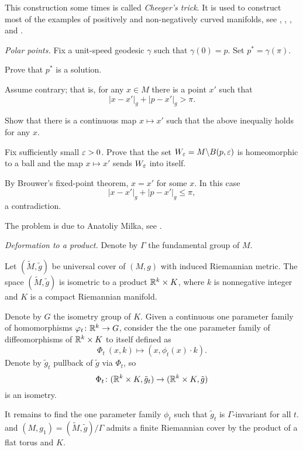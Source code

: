 This construction some times is called \emph{Cheeger's trick}.
It is used to construct most of the examples of positively and non-negatively curved manifolds,
see \cite{cheeger}, \cite{aloff-wallach}, \cite{gromoll-meyer}, \cite{eschenburg-spaces} and \cite{bazajkin}.





\textit{Polar points.}
Fix a unit-speed geodesic $\gamma$ such that $\gamma(0)=p$.
Set $p^*=\gamma(\pi)$.

Prove that $p^*$ is a solution.

Assume contrary;
that is, for any $x\in M$ there is a point $x'$ such that 
\[|x-x'|_g+|p-x'|_g>\pi.\]

Show that there is a continuous map $x\mapsto x'$
such that the above inequaliy holds for any $x$.

Fix sufficiently small $\varepsilon>0$.
Prove that the set $W_\varepsilon=M\backslash B(p,\varepsilon)$ 
is homeomorphic to a ball 
and the map $x\mapsto x'$ sends $W_\varepsilon$ into itself.

By Brouwer's fixed-point theorem, $x=x'$ for some $x$.
In this case 
\[|x-x'|_g+|p-x'|_g\le \pi,\]
a contradiction.
 
The problem is due to Anatoliy Milka, see \cite{milka-poly}.

\textit{Deformation to a product.} 
Denote by $\Gamma$ the fundamental group of $M$.

Let $(\tilde M,\tilde g)$ be universal cover of $(M,g)$ with induced Riemannian metric.
The space $(\tilde M,\tilde g)$ is isometric to a product $\mathbb{R}^k\times K$, 
where $k$ is nonnegative integer and $K$ is a compact Riemannian manifold.

Denote by $G$ the isometry group of $K$.
Given a continuous one parameter family of homomorphisms $\varphi_t\colon\mathbb{R}^k\to G$,
consider the the  one parameter family of diffeomorphisms of $\mathbb{R}^k\times K$ to itself defined as
\[\Phi_t\:(x,k)\mapsto (x,\phi_t(x)\cdot k).\]
Denote by 
 $\tilde g_t$ pullback 
of $\tilde g$ via $\Phi_t$,
so 
\[\Phi_t\colon(\mathbb{R}^k\times K,\tilde g_t)\to (\mathbb{R}^k\times K,\tilde g)\]
is an isometry.

It remains to find the one parameter family $\phi_t$ such that 
 $\tilde g_t$ is $\Gamma$-invariant for all $t$.
and $(M,g_1)=(\tilde M,\tilde g)/\Gamma$ admits a finite Riemannian cover by the product of a flat torus and $K$.


